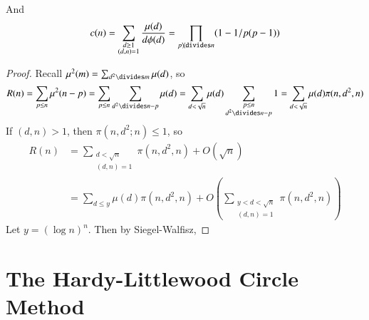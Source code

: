 And
%
\[ c(n) = \sum_{\substack{d \geq 1\\(d,n) = 1}} \frac{\mu(d)}{d \phi(d)} = \prod_{p \not \divides n} (1 - 1/p(p-1)) \]
%
\begin{proof}
    Recall $\mu^2(m) = \sum_{d^2 \divides m} \mu(d)$, so
    \[ R(n) = \sum_{p \leq n} \mu^2(n-p) = \sum_{p \leq n} \sum_{d^2 \divides n - p} \mu(d) = \sum_{d < \sqrt{n}} \mu(d) \sum_{\substack{p \leq n\\d^2 \divides n - p}} 1 = \sum_{d < \sqrt{n}} \mu(d) \pi(n,d^2,n) \]
    If $(d,n) > 1$, then $\pi(n,d^2;n) \leq 1$, so
    \begin{align*}
        R(n) &= \sum_{\substack{d < \sqrt{n}\\(d,n) = 1}} \pi(n,d^2,n) + O(\sqrt{n})\\
        &= \sum_{d \leq y} \mu(d) \pi(n,d^2,n) + O \left( \sum_{\substack{y < d < \sqrt{n}\\(d,n) = 1}} \pi(n,d^2,n) \right)
    \end{align*}
    Let $y = (\log n)^n$. Then by Siegel-Walfisz,
\end{proof}





\chapter{The Hardy-Littlewood Circle Method}

